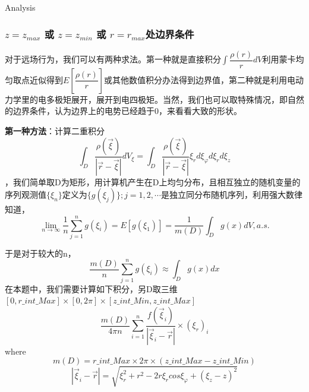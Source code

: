 \documentclass[letterpaper,12pt]{article}
\begin{document}
\begin{section}{Analysis}
        \subsubsection{$z=z_{max}$ 或 $z=z_{min}$ 或 $r=r_{max}$处边界条件}
            对于远场行为，我们可以有两种求法。第一种就是直接积分$\int \dfrac{\rho(r)}{r}dV$利用蒙卡均匀取点近似得到$E[\dfrac{\rho(r)}{r}]$或其他数值积分办法得到边界值，第二种就是利用电动力学里的电多极矩展开，展开到电四极矩。当然，我们也可以取特殊情况，即自然的边界条件，认为边界上的电势已经趋于0，来看看大致的形状。\par
            
            \indent \textbf{第一种方法}：计算二重积分$$\int_{D} \dfrac{\rho(\vec \xi)}{|\vec r-\vec \xi|}dV_\xi=\int_D\frac{\rho(\vec\xi)}{|\vec r-\vec \xi|}\xi_r d\xi_\varphi d\xi_rd\xi_z$$，我们简单取D为矩形，用计算机产生在D上均匀分布，且相互独立的随机变量的序列观测值$
        \{\xi_n\}$定义为$\{g(\xi_j)\};j=1,2,\cdots$是独立同分布随机序列，利用强大数律知道，
        $$\lim_{n \to \infty} \frac{1}{n} \sum\limits^{n}_{j=1} g(\xi_i)=E[g(\xi_1)]=\frac{1}{m(D)} \int_{D} g(x)dV,a.s.$$

            于是对于较大的n，
            $$\frac{m(D)}{n}\sum\limits^n_{j=1}g(\xi_i)\approx\int_{D}g(x)dx$$
            \indent 在本题中，我们需要计算如下积分，另D取三维$[0,r\_int\_Max]\times[0,2\pi]\times[z\_int\_Min,z\_int\_Max]$$$\frac{m(D)}{4\pi n}\sum\limits^n_{i=1}\frac{f(\vec\xi_i)}{|\vec\xi_i-\vec r|}\times (\xi_r)_i$$
            where
            $$m(D)=r\_int\_Max \times 2\pi \times (z\_int\_Max - z\_int\_Min) $$
            $$|\vec \xi_i-\vec r|=\sqrt{\xi_r^2+r^2-2r\xi_r cos\xi_\varphi + (\xi_z -z)^2}$$


\end{section}
\end{document}
